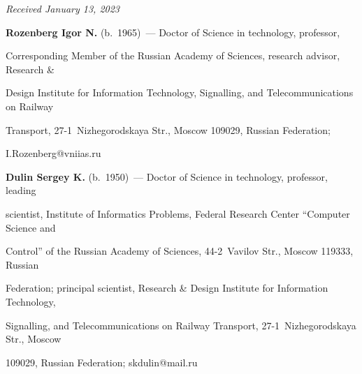 \vspace*{-6pt}





\hfill{\small\textit{Received January 13, 2023}} 





\vspace*{-12pt} 








\Contr





\noindent


\textbf{Rozenberg Igor N.} (b.\ 1965)~--- Doctor of Science in technology, professor, 


Corresponding Member of the Russian Academy of Sciences, research advisor, Research \& 


Design Institute for Information Technology, Signalling, and Telecommunications on Railway 


Transport, 27-1~Nizhegorodskaya Str., Moscow 109029, Russian Federation; 


\mbox{I.Rozenberg@vniias.ru}





\vspace*{3pt}





\noindent


\textbf{Dulin Sergey K.} (b.\ 1950)~--- Doctor of Science in technology, professor, leading 


scientist, Institute of Informatics Problems, Federal Research Center ``Computer Science and 


Control'' of the Russian Academy of Sciences, 44-2~Vavilov Str., Moscow 119333, Russian 


Federation; principal scientist, Research \& Design Institute for Information Technology, 


Signalling, and Telecommunications on Railway Transport, 27-1~Nizhegorodskaya Str., Moscow 


109029, Russian Federation; \mbox{skdulin@mail.ru}





\label{end\stat}





\renewcommand{\bibname}{\protect\rm Литература}    


